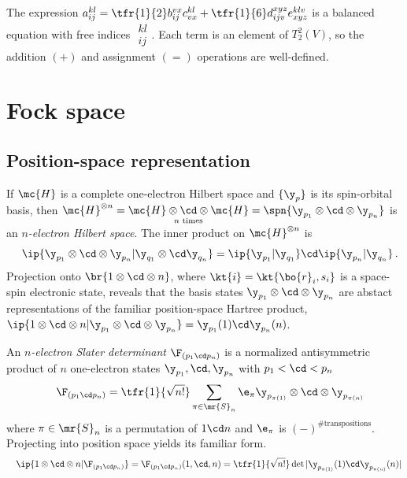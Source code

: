 \documentclass[11pt,fleqn]{article}
\numberwithin{equation}{section}
\begin{document}
\begin{ex}
The expression
$a_{ij}^{kl}=\tfr{1}{2}b_{ij}^{vx}c_{vx}^{kl}+\tfr{1}{6}d_{ijv}^{xyz}e_{xyz}^{klv}$ is a balanced equation with free indices $\substack{kl\\ij}$.
Each term is an element of $T_2^2(V)$, so the addition $(+)$ and assignment $(=)$ operations are well-defined.
\end{ex}



\newpage
\section{Fock space}

\subsection{Position-space representation}

\begin{dfn}
If $\mc{H}$ is a complete one-electron Hilbert space and $\{\y_p\}$ is its spin-orbital basis, then $\mc{H}^{\otimes n}=\underset{\text{$n$ times}}{\mc{H}\otimes\cd\otimes\mc{H}}=\spn\{\y_{p_1}\otimes\cd\otimes\y_{p_n}\}$ is an \textit{$n$-electron Hilbert space}.
The inner product on $\mc{H}^{\otimes n}$ is
\begin{align}
&&
  \ip{\y_{p_1}\otimes\cd\otimes\y_{p_n}|\y_{q_1}\otimes\cd\y_{q_n}}
=
  \ip{\y_{p_1}|\y_{q_1}}\cd\ip{\y_{p_n}|\y_{q_n}}\,.
\end{align}
Projection onto $\br{1\otimes\cd\otimes n}$, where $\kt{i}=\kt{\bo{r}_i,s_i}$ is a space-spin electronic state, reveals that the basis states $\y_{p_1}\otimes\cd\otimes\y_{p_n}$ are abstact representations of the familiar position-space Hartree product, $\ip{1\otimes\cd\otimes n|\y_{p_1}\otimes\cd\otimes\y_{p_n}}=\y_{p_1}(1)\cd\y_{p_n}(n)$.
\end{dfn}

\begin{dfn}\label{slater-determinant}
An \textit{$n$-electron Slater determinant} $\F_{(p_1\cd p_n)}$ is a normalized antisymmetric product of $n$ one-electron states $\y_{p_1},\cd,\y_{p_n}$ with $p_1<\cd<p_n$
\begin{align}
&&
  \F_{(p_1\cd p_n)}
=
  \tfr{1}{\sqrt{n!}}
  \sum_{\pi\in\mr{S}_n}
  \e_{\pi}
  \y_{p_{\pi(1)}}\otimes\cd\otimes\y_{p_{\pi(n)}}
\end{align}
where $\pi\in\mr{S}_n$ is a permutation of $1\cd n$ and $\e_{\pi}$ is $(-)^{\text{\# transpositions}}$.
Projecting into position space yields its familiar form.
\begin{align*}
&&
  \ip{1\otimes\cd\otimes n|\F_{(p_1\cd p_n)}}
=
  \F_{(p_1\cd p_n)}(1,\cd,n)
=
  \tfr{1}{\sqrt{n!}}
  \det|\y_{p_{\pi(1)}}(1)\cd\y_{p_{\pi(n)}}(n)|
\end{align*}
\end{dfn}
\end{document}
